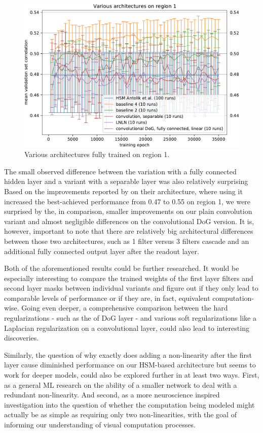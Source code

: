 \begin{figure}[H]
    \centering
    \includegraphics[width=1\textwidth]{../figures/05_3_2_1_1}
    \caption[Various architectures on region 1]{Various architectures fully trained on region 1.}
    \label{fig:5.3.2.1_1}
\end{figure}

The small observed difference between the variation with a fully connected hidden layer and a variant with a separable layer was also relatively surprising Based on the improvements reported by \cite{klindt} on their architecture, where using it increased the best-achieved performance from 0.47 to 0.55 on region 1, we were surprised by the, in comparison, smaller improvements on our plain convolution variant and almost negligible differences on the convolutional DoG version. It is, however, important to note that there are relatively big architectural differences between those two architectures, such as 1 filter versus 3 filters cascade and an additional fully connected output layer after the readout layer.

Both of the aforementioned results could be further researched. It would be especially interesting to compare the trained weights of the first layer filters and second layer masks between individual variants and figure out if they only lead to comparable levels of performance or if they are, in fact, equivalent computation-wise. Going even deeper, a comprehensive comparison between the hard regularizations - such as the of DoG layer - and various soft regularizations like a Laplacian regularization on a convolutional layer, could also lead to interesting discoveries. 

Similarly, the question of why exactly does adding a non-linearity after the first layer cause diminished performance on our HSM-based architecture but seems to work for deeper models, could also be explored further in at least two ways. First, as a general ML research on the ability of a smaller network to deal with a redundant non-linearity. And second, as a more neuroscience inspired investigation into the question of whether the computation being modeled might actually be as simple as requiring only two non-linearities, with the goal of informing our understanding of visual computation processes.


